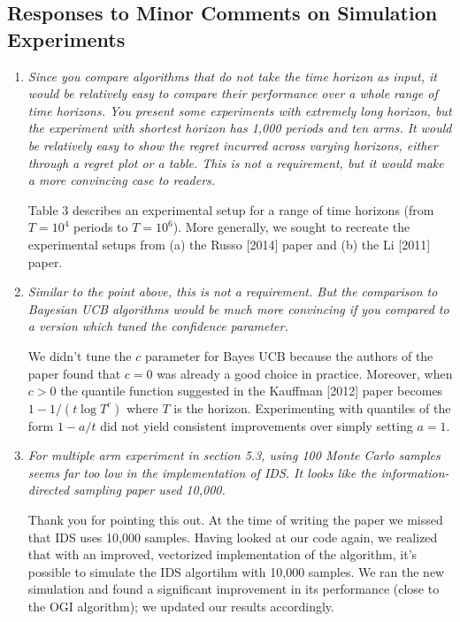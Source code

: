 \documentclass[11pt]{article}
\newcommand{\1}{\ensuremath{\mathbf{1}}} %
\theoremstyle{thm-sf}
\begin{document}
	\subsection{Responses to Minor Comments on Simulation Experiments}
	
	\begin{enumerate}
		\item {\it Since you compare algorithms that do not take the time horizon as input, it would be relatively easy to compare their performance over a whole range of time horizons. You present some experiments with extremely long horizon, but the experiment with shortest horizon has 1,000 periods and ten arms. It would be relatively easy to show the regret incurred across varying horizons, either through a regret plot or a table. This is not a requirement, but it would make a more convincing case to readers.}
		
		Table 3 describes an experimental setup for a range of time horizons (from $T=10^4$ periods to $T = 10^6$). More generally, we sought to recreate the experimental setups from (a) the Russo [2014] paper and (b) the Li [2011] paper. 
		
		\item {\it Similar to the point above, this is not a requirement. But the comparison to Bayesian UCB algorithms would be much more convincing if you compared to a version which tuned the confidence parameter.}
		
		We didn't tune the $c$ parameter for  Bayes UCB because the authors of the paper found that $c=0$ was already a good choice in practice. Moreover, when $c > 0$ the quantile function suggested in the Kauffman [2012] paper becomes $1 - 1/(t\log T^c)$ where $T$ is the horizon. Experimenting with quantiles of the form $1 - a/t$ did not yield consistent improvements over simply setting $a=1$.  
		
		\item {\it For multiple arm experiment in section 5.3, using 100 Monte Carlo samples seems far too low in the implementation of IDS. It looks like the information-directed sampling paper used 10,000.}
		
		Thank you for pointing this out. At the time of writing the paper we missed that IDS uses 10,000 samples. Having looked at our code again, we realized that with an improved, vectorized implementation of the algorithm, it's possible to simulate the IDS algortihm with 10,000 samples. We ran the new simulation and found a significant improvement in its performance (close to the OGI algorithm); we updated our results accordingly.
	\end{enumerate}
\end{document}
